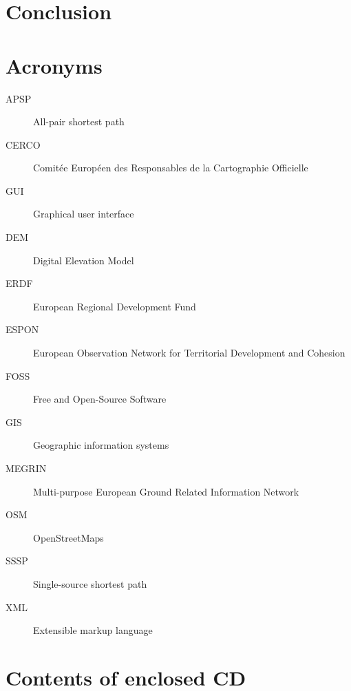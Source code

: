 \documentclass[thesis=M,english]{FITthesis}[2012/10/20]
\begin{document}
\chapter{Conclusion}





\appendix

\chapter{Acronyms}
\begin{description}
	\item[APSP] All-pair shortest path
	\item[CERCO] Comit{\' e}e Europ{\' e}en des Responsables de la Cartographie Officielle\item[GUI] Graphical user interface
	\item[DEM] Digital Elevation Model
	\item[ERDF] European Regional Development Fund
	\item[ESPON] European Observation Network for Territorial Development and Cohesion
	\item[FOSS] Free and Open-Source Software
	\item[GIS] Geographic information systems	
	\item[MEGRIN] Multi-purpose European Ground Related Information Network
	\item[OSM] OpenStreetMaps
	\item[SSSP] Single-source shortest path
	\item[XML] Extensible markup language
	
	
\end{description}


\chapter{Contents of enclosed CD}


\begin{figure}
\end{figure}
\end{document}
